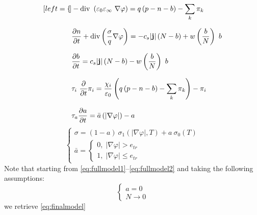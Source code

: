 \documentclass[11pt,a4paper]{article}
\begin{document}
\begin{subequations}\label{eq:fullmodel1}
	\begin{align}[left=\empheqlbrace]
		&- \mathrm{div}\ \left( \varepsilon_{0} \varepsilon_{\infty}\ \nabla \varphi
		\right)  = q \left( p - n - b \right) -  \sum_{k} \pi_{k} \\[2.5mm]
		&\dfrac{\partial n}{\partial t} + \mathrm{div} \left(  \dfrac{\sigma}{q} \nabla \varphi\right) =
		- c_s|\mathbf{j}| \left(N - b\right) +
		w \left( \dfrac{b}{N}\right) \ b\\[2.5mm]
		&\dfrac{\partial b}{\partial t} = c_s |\mathbf{j}| \left(N - b\right) - 
		w \left( \dfrac{b}{N}\right) \ b \\[2.5mm]
		&\tau_{i}\ \dfrac{\partial}{\partial t} \pi_{i} =
		\dfrac{\chi_{i}}{\varepsilon_{0}} \left( q \left( p - n - b \right) -  
		\sum_{k} \pi_{k} \right) - \pi_{i}\\[2.5mm]
		&\tau_{a} \dfrac{\partial a}{\partial t} = \bar{a}\left(|\nabla \varphi|\right) - a
	\end{align}
\end{subequations}
\begin{equation}\label{eq:fullmodel2}
	\begin{cases}
		\sigma = (1-a)\ \sigma_{1} \left(|\nabla \varphi|, T \right) +
		a\ \sigma_{0} \left( T \right)\\[3mm]
		\bar{a} = \begin{cases}
			0, \; |\nabla \varphi| > e_{tr}\\[3mm]
			1, \; |\nabla \varphi| \le e_{tr}
		\end{cases}
	\end{cases}
\end{equation}
Note that starting from \eqref{eq:fullmodel1}--\eqref{eq:fullmodel2} and taking the following assumptions:
\begin{equation}
\begin{cases}
	a = 0\\
	N\rightarrow 0
\end{cases}
\end{equation}
we retrieve \eqref{eq:finalmodel}
\end{document}
